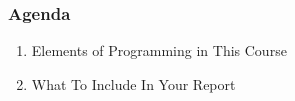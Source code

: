 \begin{frame}

\frametitle{Agenda}

\begin{enumerate}

\item Elements of Programming in This Course

\item What To Include In Your Report

\end{enumerate}

\end{frame}
